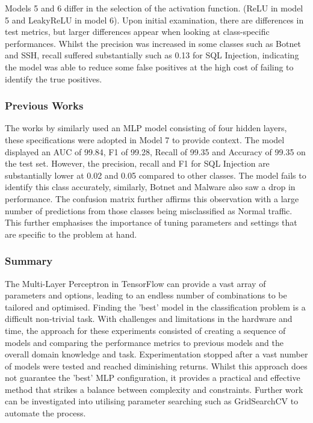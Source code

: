 Models 5 and 6 differ in the selection of the activation function. (ReLU in model 5 and LeakyReLU in model 6). Upon initial examination, there are differences in test metrics, but larger differences appear when looking at class-specific performances. 
Whilst the precision was increased in some classes such as Botnet and SSH, recall suffered substantially such as 0.13 for SQL Injection, indicating the model was able to reduce some false positives at the high cost of failing to identify the true positives. 

\subsubsection*{Previous Works}
The works by \textcite{s22155633} similarly used an MLP model consisting of four hidden layers, these specifications were adopted in Model 7 to provide context. The model displayed an AUC of 99.84, F1 of 99.28, Recall of 99.35 and Accuracy of 99.35 on the test set. However, the precision, recall and F1 for SQL Injection are substantially lower at 0.02 and 0.05 compared to other classes. The model fails to identify this class accurately, similarly, Botnet and Malware also saw a drop in performance. The confusion matrix further affirms this observation with a large number of predictions from those classes being misclassified as Normal traffic. This further emphasises the importance of tuning parameters and settings that are specific to the problem at hand. 


\subsubsection*{Summary}

The Multi-Layer Perceptron in TensorFlow can provide a vast array of parameters and options, leading to an endless number of combinations to be tailored and optimised. Finding the 'best' model in the classification problem is a difficult non-trivial task. With challenges and limitations in the hardware and time, the approach for these experiments consisted of creating a sequence of models and comparing the performance metrics to previous models and the overall domain knowledge and task. Experimentation stopped after a vast number of models were tested and reached diminishing returns. Whilst this approach does not guarantee the 'best' MLP configuration, it provides a practical and effective method that strikes a balance between complexity and constraints. Further work can be investigated into utilising parameter searching such as GridSearchCV to automate the process.

